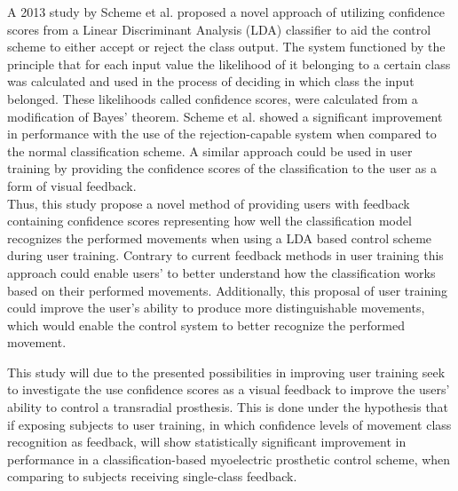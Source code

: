 A 2013 study by Scheme et al. \cite{Scheme2013} proposed a novel approach of utilizing confidence scores from a Linear Discriminant Analysis (LDA) classifier to aid the control scheme to either accept or reject the class output. The system functioned by the principle that for each input value the likelihood of it belonging to a certain class was calculated and used in the process of deciding in which class the input belonged. These likelihoods called confidence scores, were calculated from a modification of Bayes' theorem. Scheme et al. \cite{Scheme2013} showed a significant improvement in performance with the use of the rejection-capable system when compared to the normal classification scheme. A similar approach could be used in user training by providing the confidence scores of the classification to the user as a form of visual feedback. \\
Thus, this study propose a novel method of providing users with feedback containing confidence scores representing how well the classification model recognizes the performed movements when using a LDA based control scheme during user training. Contrary to current feedback methods in user training this approach could enable users' to better understand how the classification works based on their performed movements. Additionally, this proposal of user training could improve the user's ability to produce more distinguishable movements, which would enable the control system to better recognize the performed movement.  

This study will due to the presented possibilities in improving user training seek to investigate the use confidence scores as a visual feedback to improve the users' ability to control a transradial prosthesis. This is done under the hypothesis that if exposing subjects to user training, in which confidence levels of movement class recognition as feedback, will show statistically significant improvement in performance in a classification-based myoelectric prosthetic control scheme, when comparing to subjects receiving single-class feedback.




